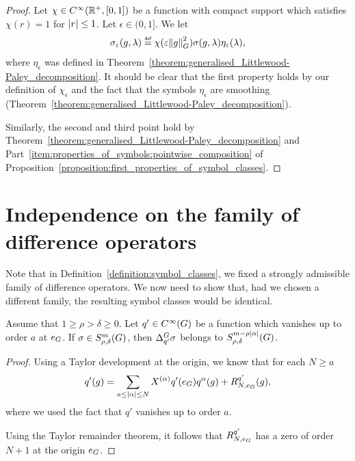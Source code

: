 \begin{proof}
    Let $\chi \in {C^\infty(\mathbb{R}^+, [0, 1])}$ be a function with compact support
    which satisfies $\chi(r) = 1$ for $\left|{r}\right| \leq 1$.
    Let $\epsilon \in (0, 1]$.
    We let
    \begin{align*}
        \sigma_\epsilon(g, \lambda)
        \defeq \chi(\epsilon \norm [\Group] g^2) \sigma(g, \lambda) \eta_\epsilon(\lambda),
    \end{align*}
    where $\eta_\epsilon$ was defined in Theorem~\ref{theorem:generalised_Littlewood-Paley_decomposition}.
    It should be clear that the first property holds by our definition of $\chi_\epsilon$
    and the fact that the symbols $\eta_\epsilon$ are smoothing (Theorem~\ref{theorem:generalised_Littlewood-Paley_decomposition}).

    Similarly,
    the second and third point hold by Theorem~\ref{theorem:generalised_Littlewood-Paley_decomposition}
    and Part~\ref{item:properties_of_symbols:pointwise_composition} of Proposition~\ref{proposition:first_properties_of_symbol_classes}.
\end{proof}

\section{Independence on the family of difference operators}

Note that in Definition~\ref{definition:symbol_classes},
we fixed a strongly admissible family of difference operators.
We now need to show that,
had we chosen a different family,
the resulting symbol classes would be identical.

\begin{proposition}
    Assume that $1 \geq \rho > \delta \geq 0$.
    Let $q' \in {C^\infty(G)}$ be a function which vanishes up to order $a$ at $e_G$.
    If $\sigma \in S^{m}_{\rho, \delta}(G)$,
    then ${\Delta^{G}_{q'}} \sigma$ belongs to $S^{m - \rho \left|{\alpha}\right|}_{\rho, \delta}(G)$.
\end{proposition}
\begin{proof}
    Using a Taylor development at the origin,
    we know that for each $N \geq a$
    \begin{align*}
        q'(g) = \sum_{a \leq \left|{\alpha}\right| \leq N} X^{(\alpha)} q'(e_G) q^\alpha(g) + R^{q'}_{N, e_G}(g),
    \end{align*}
    where we used the fact that $q'$ vanishes up to order $a$.

    Using the Taylor remainder theorem,
    it follows that $R^{q'}_{N, e_G}$ has a zero of order $N + 1$ at the origin $e_G$.
\end{proof}

